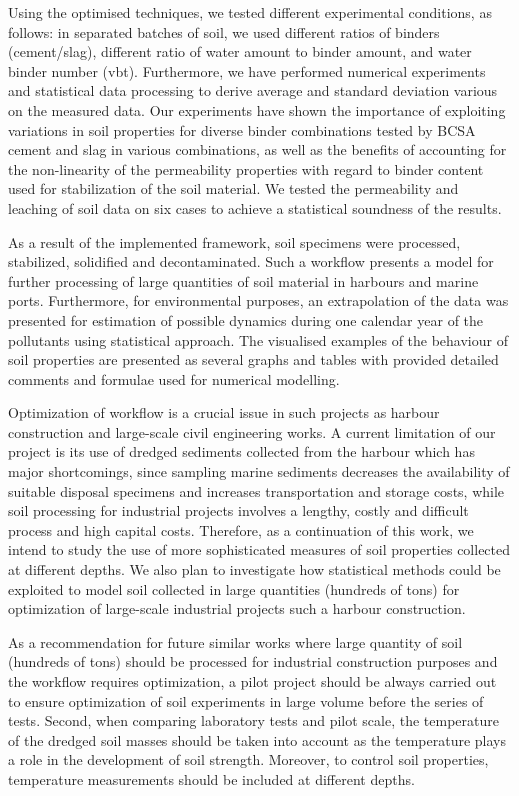 \documentclass[algorithms,article,submit,pdftex,moreauthors]{Definitions/mdpi}
\begin{document}
Using the optimised techniques, we tested different experimental conditions, as follows: in separated batches of soil, we used different ratios of binders (cement/slag), different ratio of water amount to binder amount, and water binder number (vbt). Furthermore, we have performed numerical experiments and statistical data processing to derive average and standard deviation various on the measured data. Our experiments have shown the importance of exploiting variations in soil properties for diverse binder combinations tested by BCSA cement and slag in various combinations, as well as the benefits of accounting for the non-linearity of the permeability properties with regard to binder content used for stabilization of the soil material. We tested the permeability and leaching of soil data on six cases to achieve a statistical soundness of the results. 

As a result of the implemented framework, soil specimens were processed, stabilized, solidified and decontaminated. Such a workflow presents a model for further processing of large quantities of soil material in harbours and marine ports. Furthermore, for environmental purposes, an extrapolation of the data was presented for estimation of possible dynamics during one calendar year of the pollutants using statistical approach. The visualised examples of the behaviour of soil properties are presented as several graphs and tables with provided detailed comments and formulae used for numerical modelling.

Optimization of workflow is a crucial issue in such projects as harbour construction and large-scale civil engineering works. A current limitation of our project is its use of dredged sediments collected from the harbour which has major shortcomings, since sampling marine sediments decreases the availability of suitable disposal specimens and increases transportation and storage costs, while soil processing for industrial projects involves a lengthy, costly and difficult process and high capital costs. Therefore, as a continuation of this work, we intend to study the use of more sophisticated measures of soil properties collected at different depths. We also plan to investigate how statistical methods could be exploited to model soil collected in large quantities (hundreds of tons) for optimization of large-scale industrial projects such a harbour construction. 

As a recommendation for future similar works where large quantity of soil (hundreds of tons) should be processed for industrial construction purposes and the workflow requires optimization, a pilot project should be always carried out to ensure optimization of soil experiments in large volume before the series of tests. Second, when comparing laboratory tests and pilot scale, the temperature of the dredged soil masses should be taken into account as the temperature plays a role in the development of soil strength. Moreover, to control soil properties, temperature measurements should be included at different depths. 
\end{document}
